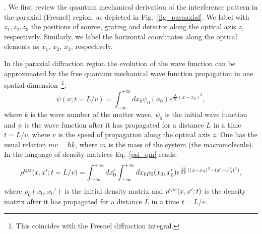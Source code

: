 \documentclass[12pt,groupedaddress,pra,aps]{revtex4-1}
\begin{document}
.
We first review the quantum mechanical derivation of the interference pattern in the paraxial (Fresnel) region, as depicted in Fig.~\ref{fig_paraaxial}. We label with $z_1, z_2, z_3$ the positions of source, grating and detector along the optical axis $z$, respectively. Similarly, we label the horizontal coordinates along the optical elements as $x_1$, $x_2$, $x_3$, respectively.  

In the paraxial diffraction region the evolution of the wave function can be approximated by the free quantum mechanical wave function propagation in one spatial dimension~\footnote{This coincides with the Fresnel diffraction integral.}:
\begin{equation}\label{psi_qm}
\psi(x;t=L/v)=\int_{-\infty}^{+\infty} dx_0 \psi_0(x_0) e^{\frac{ik}{2L}(x-x_0)^2},
\end{equation}
where $k$ is the wave number of the matter wave, $\psi_0$ is the initial wave function and $\psi$ is the wave function after it has propagated for a distance $L$ in a time $t=L/v$, where $v$ is the speed of propagation along the optical axis $z$. One has the usual relation $mv=\hbar k$, where $m$ is the mass of the system (the macromolecule). 
In the language of density matrices Eq.~\eqref{psi_qm} reads:
\begin{equation}\label{rho_qm}
\rho^{\text{\tiny QM}}(x,x';t=L/v)=\int_{-\infty}^{+\infty}dx_0' \int_{-\infty}^{+\infty} dx_0 \rho_0(x_0,x_0')
e^{\frac{ik}{2L}((x-x_0)^2-(x'-x_0')^2)},
\end{equation}
where $\rho_0(x_0,x_0')$ is the initial density matrix and $\rho^{\text{\tiny QM}}(x,x';t)$ is the density matrix after it has propagated for a distance $L$ in a time $t=L/v$.
\end{document}
